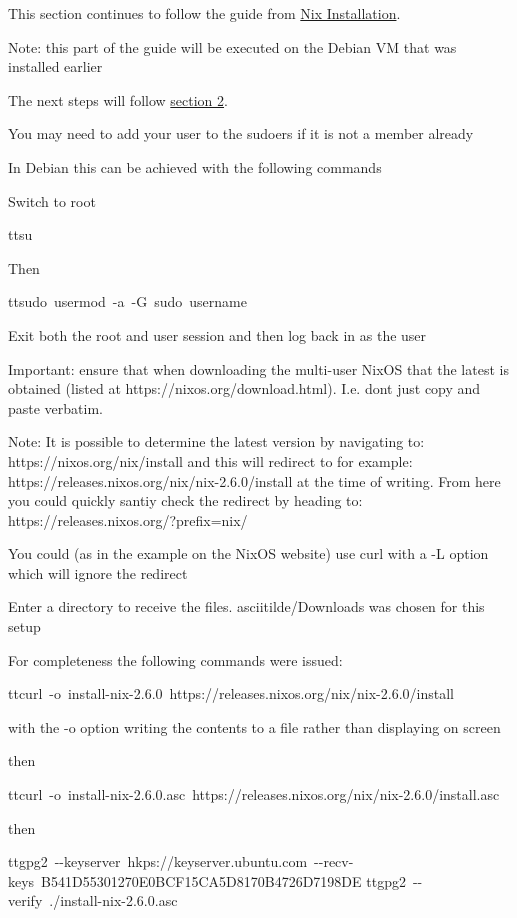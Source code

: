 This section continues to follow the guide from
\href{https://github.com/fort-nix/nix-bitcoin/blob/master/docs/install.md}{Nix
Installation}.

Note: this part of the guide will be executed on the Debian VM that was
installed earlier

The next steps will follow
\href{https://github.com/fort-nix/nix-bitcoin/blob/master/docs/install.md\#2-nix-installation}{section
2}.

You may need to add your user to the sudoers if it is not a member
already

In Debian this can be achieved with the following commands

Switch to root

tt{su}

Then

tt{sudo\ usermod\ -a\ -G\ sudo\ username}

Exit both the root and user session and then log back in as the user

Important: ensure that when downloading the multi-user NixOS that the
latest is obtained (listed at https://nixos.org/download.html). I.e.
dont just copy and paste verbatim.

Note: It is possible to determine the latest version by navigating to:
https://nixos.org/nix/install and this will redirect to for example:
https://releases.nixos.org/nix/nix-2.6.0/install at the time of writing.
From here you could quickly santiy check the redirect by heading to:
https://releases.nixos.org/?prefix=nix/

You could (as in the example on the NixOS website) use curl with a -L
option which will ignore the redirect

Enter a directory to receive the files. asciitilde/Downloads was
chosen for this setup

For completeness the following commands were issued:

tt{curl\ -o\ install-nix-2.6.0\ https://releases.nixos.org/nix/nix-2.6.0/install}

with the -o option writing the contents to a file rather than displaying
on screen

then

tt{curl\ -o\ install-nix-2.6.0.asc\ https://releases.nixos.org/nix/nix-2.6.0/install.asc}

then

tt{gpg2\ -\/-keyserver\ hkps://keyserver.ubuntu.com\ -\/-recv-keys\ B541D55301270E0BCF15CA5D8170B4726D7198DE}
tt{gpg2\ -\/-verify\ ./install-nix-2.6.0.asc}

